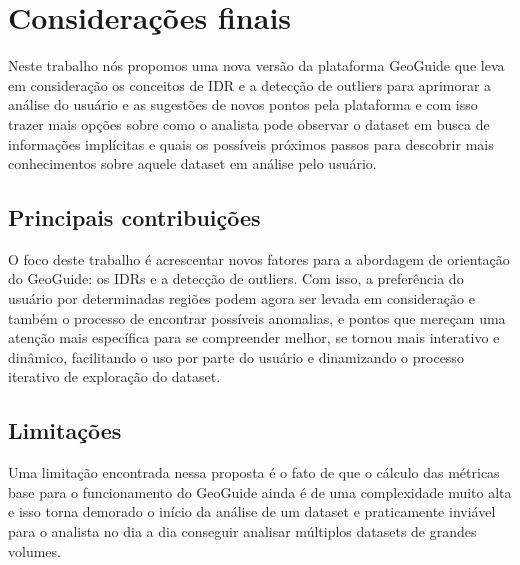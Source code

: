 \chapter{Considerações finais}


Neste trabalho nós propomos uma nova versão da plataforma GeoGuide \cite{omidvarTehrani2017} que leva em consideração os conceitos de IDR e a detecção de outliers para aprimorar a análise do usuário e as sugestões de novos pontos pela plataforma e com isso trazer mais opções sobre como o analista pode observar o dataset em busca de informações implícitas e quais os possíveis próximos passos para descobrir mais conhecimentos sobre aquele dataset em análise pelo usuário.

\section{Principais contribuições}

O foco deste trabalho é acrescentar novos fatores para a abordagem de orientação do GeoGuide: os IDRs e a detecção de outliers. Com isso, a preferência do usuário por determinadas regiões podem agora ser levada em consideração e também o processo de encontrar possíveis anomalias, e pontos que mereçam uma atenção mais específica para se compreender melhor, se tornou mais interativo e dinâmico, facilitando o uso por parte do usuário e dinamizando o processo iterativo de exploração do dataset.

\section{Limitações}

Uma limitação encontrada nessa proposta é o fato de que o cálculo das métricas base para o funcionamento do GeoGuide ainda é de uma complexidade muito alta e isso torna demorado o início da análise de um dataset e praticamente inviável para o analista no dia a dia conseguir analisar múltiplos datasets de grandes volumes.

